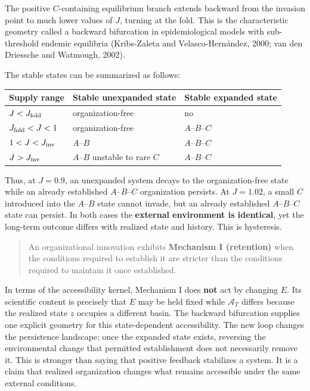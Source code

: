 \documentclass[11pt]{article}
\begin{document}
The positive \(C\)-containing equilibrium branch extends backward from
the invasion point to much lower values of \(J\), turning at the fold.
This is the characteristic geometry called a backward bifurcation in
epidemiological models with sub-threshold endemic equilibria
(Kribs-Zaleta and Velasco-Hernández, 2000; van den Driessche and
Watmough, 2002).

The stable states can be summarized as follows:

\begin{longtable}[]{@{}lll@{}}
\toprule\noalign{}
Supply range & Stable unexpanded state & Stable expanded state \\
\midrule\noalign{}
\endhead
\bottomrule\noalign{}
\endlastfoot
\(J < J_{\rm fold}\) & organization-free & no \\
\(J_{\rm fold} < J < 1\) & organization-free & \(A\)--\(B\)--\(C\) \\
\(1 < J < J_{\rm inv}\) & \(A\)--\(B\) & \(A\)--\(B\)--\(C\) \\
\(J > J_{\rm inv}\) & \(A\)--\(B\) unstable to rare \(C\) &
\(A\)--\(B\)--\(C\) \\
\end{longtable}

Thus, at \(J=0.9\), an unexpanded system decays to the organization-free
state while an already established \(A\)--\(B\)--\(C\) organization
persists. At \(J=1.02\), a small \(C\) introduced into the \(A\)--\(B\)
state cannot invade, but an already established \(A\)--\(B\)--\(C\)
state can persist. In both cases the \textbf{external environment is
identical}, yet the long-term outcome differs with realized state and
history. This is hysteresis.

\begin{quote}
An organizational innovation exhibits \textbf{Mechanism I (retention)}
when the conditions required to establish it are stricter than the
conditions required to maintain it once established.
\end{quote}

In terms of the accessibility kernel, Mechanism I does \textbf{not} act
by changing \(E\). Its scientific content is precisely that \(E\) may be
held fixed while \(\mathcal A_T\) differs because the realized state
\(z\) occupies a different basin. The backward bifurcation supplies one
explicit geometry for this state-dependent accessibility. The new loop
changes the persistence landscape; once the expanded state exists,
reversing the environmental change that permitted establishment does not
necessarily remove it. This is stronger than saying that positive
feedback stabilizes a system. It is a claim that realized organization
changes what remains accessible under the same external conditions.
\end{document}
